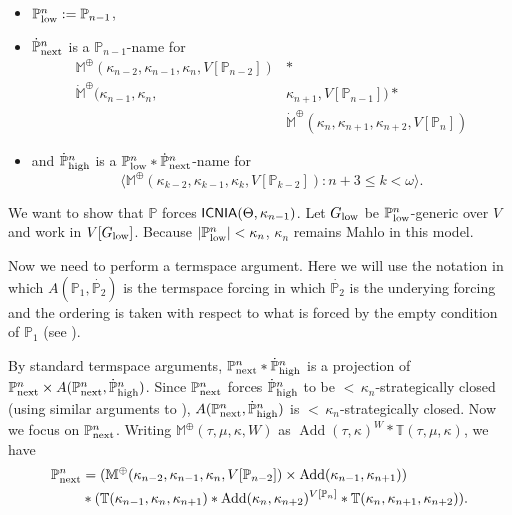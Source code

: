 \documentclass[a4paper]{amsart}
\theoremstyle{definition}
\theoremstyle{remark}
\theoremstyle{plain}
\numberwithin{mydef}{section}
\DeclareMathOperator{\Add}{Add}
\DeclareMathOperator{\ICNIA}{\textup{\textsf{ICNIA}}}
\newcommand{\dM}{\mathbb{M}}
\newcommand{\dP}{\mathbb{P}}
\newcommand{\dT}{\mathbb{T}}
\newcommand{\seq}[2]{\langle #1 : #2 \rangle}
\begin{document}
\begin{itemize}

\item $\dP_\textup{low}^n :=\dP_{n-1}$,

\item $\dot{\dP}_\textup{next}^n$ is a $\dP_{n-1}$-name for
\begin{align*}\dM^{\oplus}(\kappa_{n-2},\kappa_{n-1},\kappa_n,V[\dP_{n-2}])& \ast \\ \dot{\dM}^{\oplus}(\kappa_{n-1},\kappa_n, & \kappa_{n+1},V[\dP_{n-1}])\ast \\  & \dot{\dM}^{\oplus}(\kappa_n,\kappa_{n+1},\kappa_{n+2},V[\dP_n])\end{align*}

\item and $\dot{\dP}_\textup{high}^n$ is a $\dP_\textup{low}^n \ast \dot{\dP}_\textup{next}^n$-name for
\[
\seq{\dM^\oplus(\kappa_{k-2},\kappa_{k-1},\kappa_k,V[\dP_{k-2}])}{n+3 \le k<\omega}.
\]
\end{itemize}
	We want to show that $\dP$ forces $\ICNIA(\Theta,\kappa_{n-1})$. Let $G_\textup{low}$ be $\dP_\textup{low}^n$-generic over $V$ and work in $V[G_{\textup{low}}]$. Because $|\dP_\textup{low}^n|<\kappa_n$, $\kappa_n$ remains Mahlo in this model.

Now we need to perform a termspace argument. Here we will use the notation in which $A(\dP_1,\dot{\dP_2})$ is the termspace forcing in which $\dot{\dP_2}$ is the underying forcing and the ordering is taken with respect to what is forced by the empty condition of $\dP_1$ (see \cite[Section 22]{Handbook-Cummings}).

By standard termspace arguments, $\dP_\textup{next}^n\ast\dot{\dP}_\textup{high}^n$ is a projection of $\dP_\textup{next}^n\times A(\dP_\textup{next}^n,\dot{\dP}_\textup{high}^n)$. Since $\dP_\textup{next}^n$ forces $\dot{\dP}_\textup{high}^n$ to be ${<}\,\kappa_n$-strategically closed (using similar arguments to \cite{Cummings-Foreman1998}), $A(\dP_\textup{next}^n,\dot{\dP}_\textup{high}^n)$ is ${<}\,\kappa_n$-strategically closed. Now we focus on $\dP_\textup{next}^n$. Writing $\dM^{\oplus}(\tau,\mu,\kappa,W)$ as $\Add(\tau,\kappa)^W*\dT(\tau,\mu,\kappa)$, we have
\begin{align*}
	\dP_\textup{next}^n & =(\dM^{\oplus}(\kappa_{n-2},\kappa_{n-1},\kappa_n,V[\dP_{n-2}])\times\Add(\kappa_{n-1},\kappa_{n+1})) \\
	& \ast (\dT(\kappa_{n-1},\kappa_n,\kappa_{n+1})*\Add(\kappa_n,\kappa_{n+2})^{V[\dP_n]}*\dT(\kappa_n,\kappa_{n+1},\kappa_{n+2})).
\end{align*}
\end{document}
